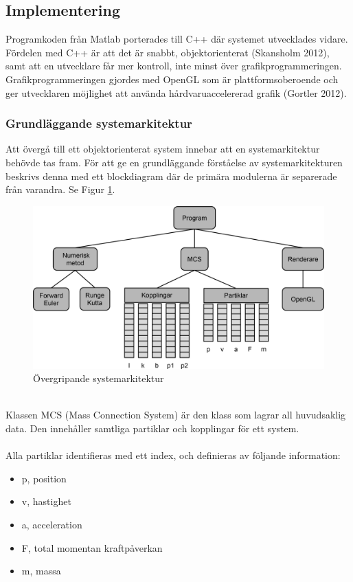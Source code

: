 \documentclass[a4paper,12pt,oneside,final,swedish]{extarticle}
\begin{document}
\subsection{Implementering}
Programkoden från Matlab porterades till C++ där systemet utvecklades vidare. Fördelen med C++ är att det är snabbt, objektorienterat (Skansholm 2012), samt att en utvecklare får mer kontroll, inte minst över grafikprogrammeringen. Grafikprogrammeringen gjordes med OpenGL som är plattformsoberoende och ger utvecklaren möjlighet att använda hårdvaruaccelererad grafik (Gortler 2012).
\subsubsection{Grundläggande systemarkitektur}
Att övergå till ett objektorienterat system innebar att en systemarkitektur behövde tas fram. 
För att ge en grundläggande förståelse av systemarkitekturen beskrivs denna med ett blockdiagram där de primära modulerna är separerade från varandra. 
Se Figur \ref{systemark::nonfloat}.
\begin{figure}[h!]
  \begin{center}
    \includegraphics[width=16cm]{Bilder/Arkitektur.png} 
  \end{center}
  \caption{Övergripande systemarkitektur}
  \label{systemark::nonfloat}
\end{figure}
\\Klassen MCS (Mass Connection System) är den klass som lagrar all huvudsaklig data. Den innehåller samtliga partiklar och kopplingar för ett system.
\\\\Alla partiklar identifieras med ett index, och definieras av följande information:
\begin{itemize}
  \item p, position
  \item v, hastighet
  \item a, acceleration
  \item F, total momentan kraftpåverkan
  \item m, massa
\end{itemize}
\end{document}
